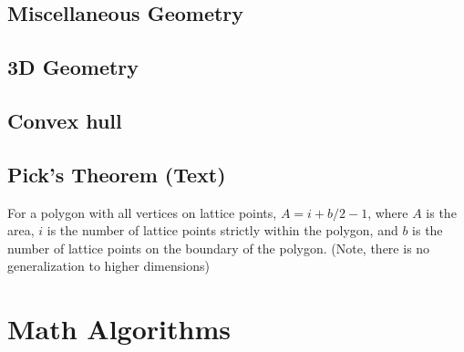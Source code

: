 \documentclass[12pt]{extarticle}
\begin{document}
\begin{multicols*}{2}
\subsection{Miscellaneous Geometry} %


\subsection{3D Geometry}


\subsection{Convex hull} %


% 

% 

\subsection{Pick's Theorem (Text)} %
For a polygon with all vertices on lattice points, $A = i + b/2 - 1$, where $A$
is the area, $i$ is the number of lattice points strictly within the polygon,
and $b$ is the number of lattice points on the boundary of the polygon. (Note,
there is no generalization to higher dimensions)

\section{Math Algorithms}

% 


\end{multicols*}
\end{document}
